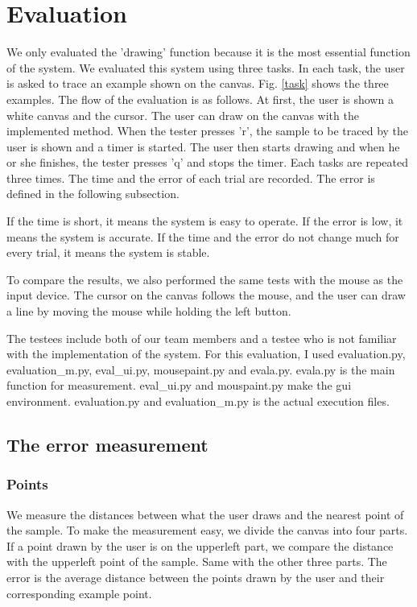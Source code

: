 \clearpage
\section{Evaluation}
We only evaluated the 'drawing' function because it is the most essential function of the system.
We evaluated this system using three tasks. In each task, the user is asked to trace an example shown on the canvas. Fig. \ref{task} shows the three examples.
The flow of the evaluation is as follows. At first, the user is shown a white canvas and the cursor. The user can draw on the canvas with the implemented method. 
When the tester presses 'r', the sample to be traced by the user is shown and a timer is started.
The user then starts drawing and when he or she finishes, the tester presses 'q' and stops the timer.
Each tasks are repeated three times. The time and the error of each trial are recorded. The error is defined in the following subsection. 

If the time is short, it means the system is easy to operate.
If the error is low, it means the system is accurate.
If the time and the error do not change much for every trial, it means the system is stable.
\par  
To compare the results, we also performed the same tests with the mouse as the input device. The cursor on the canvas follows the mouse, and the user can draw a line by moving the mouse while holding the left button. 

The testees include both of our team members and a testee who is not familiar with the implementation of the system. 
For this evaluation, I used evaluation.py, evaluation\_m.py, eval\_ui.py, mousepaint.py and evala.py.
evala.py is the main function for measurement. eval\_ui.py and mouspaint.py make the gui environment. evaluation.py and evaluation\_m.py is the actual execution files.
\subsection{The error measurement}
\subsubsection{Points}
We measure the distances between what the user draws and the nearest point of the sample.
To make the measurement easy, we divide the canvas into four parts.
If a point drawn by the user is on the upperleft part, we compare the distance with the upperleft point of the sample. Same with the other three parts. The error is the average distance between the points drawn by the user and their corresponding example point. 
